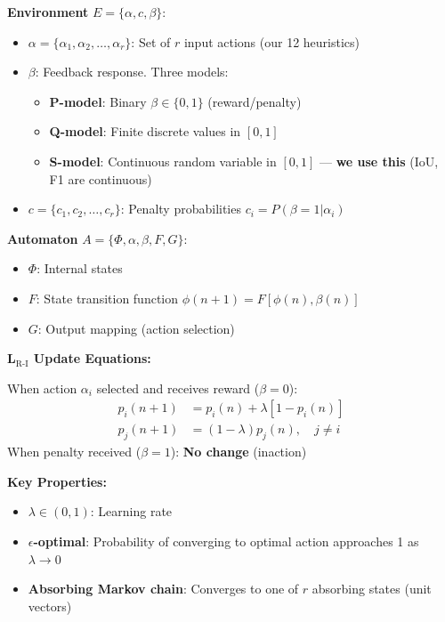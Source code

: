 \documentclass[11pt]{article}
\begin{document}
\textbf{Environment} $E = \{\alpha, c, \beta\}$:
\begin{itemize}
    \item $\alpha = \{\alpha_1, \alpha_2, \ldots, \alpha_r\}$: Set of $r$ input actions (our 12 heuristics)
    \item $\beta$: Feedback response. Three models:
    \begin{itemize}
        \item \textbf{P-model}: Binary $\beta \in \{0, 1\}$ (reward/penalty)
        \item \textbf{Q-model}: Finite discrete values in $[0,1]$
        \item \textbf{S-model}: Continuous random variable in $[0,1]$ --- \textbf{we use this} (IoU, F1 are continuous)
    \end{itemize}
    \item $c = \{c_1, c_2, \ldots, c_r\}$: Penalty probabilities $c_i = P(\beta=1 | \alpha_i)$
\end{itemize}

\textbf{Automaton} $A = \{\Phi, \alpha, \beta, F, G\}$:
\begin{itemize}
    \item $\Phi$: Internal states
    \item $F$: State transition function $\phi(n+1) = F[\phi(n), \beta(n)]$
    \item $G$: Output mapping (action selection)
\end{itemize}

\textbf{L$_{\text{R-I}}$ Update Equations:}

When action $\alpha_i$ selected and receives reward ($\beta = 0$):
\begin{align}
p_i(n+1) &= p_i(n) + \lambda[1 - p_i(n)] \\
p_j(n+1) &= (1-\lambda) p_j(n), \quad j \neq i
\end{align}
When penalty received ($\beta = 1$): \textbf{No change} (inaction)

\textbf{Key Properties:}
\begin{itemize}
    \item $\lambda \in (0, 1)$: Learning rate
    \item \textbf{$\epsilon$-optimal}: Probability of converging to optimal action approaches 1 as $\lambda \to 0$
    \item \textbf{Absorbing Markov chain}: Converges to one of $r$ absorbing states (unit vectors)
\end{itemize}
\end{document}
